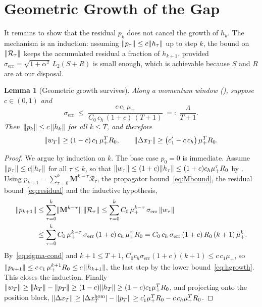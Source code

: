 \documentclass[11pt]{article}
\theoremstyle{plain}
\newtheorem{lemma}{Lemma}[section]
\theoremstyle{definition}
\theoremstyle{remark}
\DeclarePairedDelimiter{\norm}{\lVert}{\rVert}
\DeclarePairedDelimiter{\abs}{\lvert}{\rvert}
\newcommand{\mup}{\mu_{+}}
\newcommand{\Mmat}{\mathbf{M}}
\newcommand{\sg}{\sigma_{\mathrm{err}}}
\begin{document}
\section{Geometric Growth of the Gap}
\label{sec:induction}

It remains to show that the residual $p_{k}$ does not cancel the growth
of $h_{k}$. The mechanism is an induction: assuming
$\norm{p_{\tau}}\le c\norm{h_{\tau}}$ up to step $k$, the bound on
$\norm{\mathcal{R}_{\tau}}$ keeps the accumulated residual a fraction of
$h_{k+1}$, provided $\sg=\sqrt{1+\alpha^{2}}\,L_{2}(S+R)$ is small enough, which is achievable because
$S$ and $R$ are at our disposal.

\begin{lemma}[Geometric growth survives]
\label{lem:induction}
Along a momentum window (), suppose $c\in(0,1)$ and
\begin{equation}\label{eq:sigma-cond}
  \sg\;\le\;\frac{c\,c_{1}\,\mup}{C_{0}\,c_{h}\,(1+c)\,(T+1)}\;=:\;\frac{\Lambda}{T+1}.
\end{equation}
Then $\norm{p_{k}}\le c\,\norm{h_{k}}$ for all $k\le T$, and therefore
\begin{equation}\label{eq:gap-grows}
  \norm{w_{T}}\ge(1-c)\,c_{1}\,\mup^{T}R_{0},
  \qquad
  \norm{\Delta x_{T}}\ge\big(c_{1}'-c\,c_{h}\big)\,\mup^{T}R_{0}.
\end{equation}
\end{lemma}

\begin{proof}
We argue by induction on $k$. The base case $p_{0}=0$ is immediate.
Assume $\norm{p_{\tau}}\le c\norm{h_{\tau}}$ for all $\tau\le k$, so that
$\norm{w_{\tau}}\le(1+c)\norm{h_{\tau}}\le(1+c)c_{h}\mup^{\tau}R_{0}$ by
. Using
$p_{k+1}=\sum_{\tau=0}^{k}\Mmat^{k-\tau}\mathcal{R}_{\tau}$,
the propagator bound~\eqref{eq:Mbound}, the residual
bound~\eqref{eq:residual} and the inductive hypothesis,
\begin{align*}
  \norm{p_{k+1}}
  &\le\sum_{\tau=0}^{k}\norm{\Mmat^{k-\tau}}\,\norm{\mathcal{R}_{\tau}}
  \le\sum_{\tau=0}^{k}C_{0}\,\mup^{k-\tau}\,\sg\,\norm{w_{\tau}}\\
  &\le\sum_{\tau=0}^{k}C_{0}\,\mup^{k-\tau}\,\sg\,(1+c)\,c_{h}\,\mup^{\tau}R_{0}
  = C_{0}\,c_{h}\,\sg\,(1+c)\,R_{0}\,(k+1)\,\mup^{k}.
\end{align*}
By~\eqref{eq:sigma-cond} and $k+1\le T+1$,
$C_{0}c_{h}\sg(1+c)(k+1)\le c\,c_{1}\mup$, so
$\norm{p_{k+1}}\le c\,c_{1}\,\mup^{k+1}R_{0}\le c\,\norm{h_{k+1}}$,
the last step by the lower bound~\eqref{eq:hgrowth}. This closes the
induction. Finally
$\norm{w_{T}}\ge\norm{h_{T}}-\norm{p_{T}}\ge(1-c)\norm{h_{T}}
\ge(1-c)c_{1}\mup^{T}R_{0}$, and projecting onto the position block,
$\norm{\Delta x_{T}}\ge\abs{\Delta x_{T}^{\mathrm{hom}}}
-\norm{p_{T}}\ge c_{1}'\mup^{T}R_{0}-c\,c_{h}\mup^{T}R_{0}$.
\end{proof}
\end{document}
